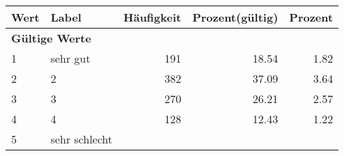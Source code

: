      \begin{longtable}{lXrrr}
     \toprule
     \textbf{Wert} & \textbf{Label} & \textbf{Häufigkeit} & \textbf{Prozent(gültig)} & \textbf{Prozent} \\
     \endhead
     \midrule
     \multicolumn{5}{l}{\textbf{Gültige Werte}}\\

     1 &
     \multicolumn{1}{X}{ sehr gut   } &


       \num{191} &
       \num[round-mode=places,round-precision=2]{18,54} &
         \num[round-mode=places,round-precision=2]{1,82} \\

     2 &
     \multicolumn{1}{X}{ 2   } &


       \num{382} &
       \num[round-mode=places,round-precision=2]{37,09} &
         \num[round-mode=places,round-precision=2]{3,64} \\

     3 &
     \multicolumn{1}{X}{ 3   } &


       \num{270} &
       \num[round-mode=places,round-precision=2]{26,21} &
         \num[round-mode=places,round-precision=2]{2,57} \\

     4 &
     \multicolumn{1}{X}{ 4   } &


       \num{128} &
       \num[round-mode=places,round-precision=2]{12,43} &
         \num[round-mode=places,round-precision=2]{1,22} \\

     5 &
     \multicolumn{1}{X}{ sehr schlecht   } &



\end{longtable}

